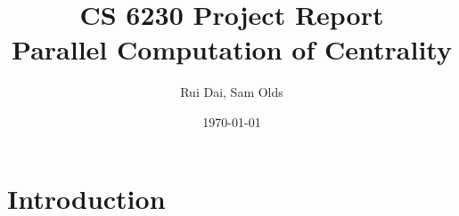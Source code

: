 \documentclass[11pt,a4paper,twocolumn,titlepage]{article}
\title{CS 6230 Project Report\\\textbf{Parallel Computation of  Centrality}}
\author{Rui Dai, Sam Olds}
\date{\today}
\begin{document}
\maketitle
\newpage





\section{Introduction} %
\label{sec:intro}
\end{document}
